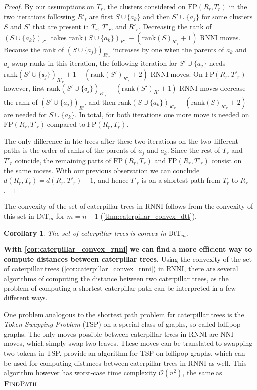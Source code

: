 \documentclass[11pt]{amsart}
\newtheorem{corollary}{Corollary}
\newcommand{\rnni}{\mathrm{RNNI}}
\newcommand{\findpath}{\textsc{FindPath}}
\newcommand{\rank}{\mathrm{rank}}
\newcommand{\nni}{\mathrm{NNI}}
\newcommand{\fp}{\mathrm{FP}}
\newcommand{\dtt}{\mathrm{DtT}}
\renewcommand{\O}{\mathcal O}
\newcommand{\summary}[1]{\textbf{#1}} %
\begin{document}
\begin{proof}
	By our assumptions on $T_r$, the clusters considered on $\fp(R_r,T_r)$ in the two iterations following $R'_r$ are first $S \cup \{a_k\}$ and then $S' \cup \{a_j\}$ for some clusters $S$ and $S'$ that are present in $T_r$, $T'_r$, and $R'_r$.
	Decreasing the rank of $(S \cup \{a_k\})_{R'_r}$ takes $\rank(S \cup \{a_k\})_{R'_r} - (\rank(S)_{R'_r} + 1)$ $\rnni$ moves.
	Because the rank of $(S \cup \{a_j\})_{R'_r}$ increases by one when the parents of $a_k$ and $a_j$ swap ranks in this iteration, the following iteration for $S' \cup \{a_j\}$ needs $\rank(S' \cup \{a_j\})_{R'_r} + 1 - (\rank(S')_{R'_r} + 2)$ $\rnni$ moves.
	On $\fp(R_r,T'_r)$ however, first $\rank(S' \cup \{a_j\})_{R'_r} - (\rank(S')_{R'} + 1)$ $\rnni$ moves decrease the rank of $(S' \cup \{a_j\})_{R'}$, and then $\rank(S \cup \{a_k\})_{R'_r} - (\rank(S)_{R'_r} + 2)$ are needed for $S \cup \{a_k\}$.
	In total, for both iterations one more move is needed on $\fp(R_r, T'_r)$ compared to $\fp(R_r, T_r)$. 

	The only difference in hte trees after these two iterations on the two different paths is the order of ranks of the parents of $a_j$ and $a_k$.
	Since the rest of $T_r$ and $T'_r$ coincide, the remaining parts of $\fp(R_r, T_r)$ and $\fp(R_r, T'_r)$ consist on the same moves.
	With our previous observation we can conclude $d(R_r,T_r) = d(R_r,T'_r) + 1$, and hence $T'_r$ is on a shortest path from $T_r$ to $R_r$.
\end{proof}

The convexity of the set of caterpillar trees in $\rnni$ follows from the convexity of this set in $\dtt_m$ for $m = n-1$ (\autoref{thm:caterpillar_convex_dtt}).

\begin{corollary}
	The set of caterpillar trees is convex in $\dtt_m$.
	\label{cor:caterpillar_convex_rnni}
\end{corollary}

\summary{With \autoref{cor:caterpillar_convex_rnni} we can find a more efficient way to compute distances between caterpillar trees.}
Using the convexity of the set of caterpillar trees (\autoref{cor:caterpillar_convex_rnni}) in $\rnni$, there are several algorithms of computing the distance between two caterpillar trees, as the problem of computing a shortest caterpillar path can be interpreted in a few different ways.

One problem analogous to the shortest path problem for caterpillar trees is the \emph{Token Swapping Problem} (TSP) \autocite{Kawahara2017-ey} on a special class of graphs, so-called lollipop graphs.
The only moves possible between caterpillar trees in $\rnni$ are $\nni$ moves, which simply swap two leaves.
These moves can be translated to swapping two tokens in TSP.
\textcite{Kawahara2017-ey} provide an algorithm for TSP on lollipop graphs, which can be used for computing distances between caterpillar trees in $\rnni$ as well.
This algorithm however has worst-case time complexity $\O(n^2)$, the same as $\findpath$.
\end{document}
